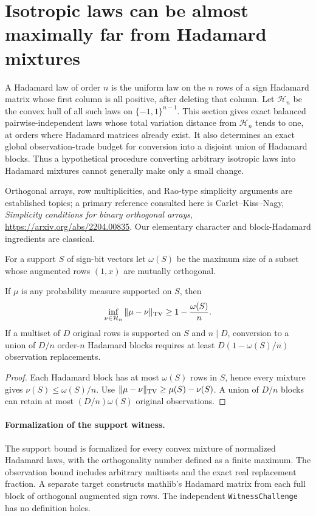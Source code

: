 
\section{Isotropic laws can be almost maximally far from Hadamard mixtures}
\label{s25:sec:design-hadamard-distance}
A Hadamard law of order $n$ is the uniform law on the $n$ rows of a
sign Hadamard matrix whose first column is all positive, after deleting
that column. Let $\mathcal H_n$ be the convex hull of all such laws on
$\{-1,1\}^{n-1}$. This section gives exact balanced pairwise-independent
laws whose total variation distance from $\mathcal H_n$ tends to one,
at orders where Hadamard matrices already exist. It also determines
an exact global observation-trade budget for conversion into a disjoint
union of Hadamard blocks. Thus a hypothetical procedure converting
arbitrary isotropic laws into Hadamard mixtures cannot generally make
only a small change.

Orthogonal arrays, row multiplicities, and Rao-type simplicity arguments
are established topics; a primary reference consulted here is
Carlet--Kiss--Nagy, \emph{Simplicity conditions for binary orthogonal arrays},
\url{https://arxiv.org/abs/2204.00835}. Our elementary character and
block-Hadamard ingredients are classical.

For a support $S$ of sign-bit vectors let $\omega(S)$ be the maximum
size of a subset whose augmented rows $(1,x)$ are mutually orthogonal.
\begin{lemma}
\label{s25:lem:design-support-witness}
If $\mu$ is any probability measure supported on $S$, then
\[
 \inf_{\nu\in\mathcal H_n}\|\mu-\nu\|_{\rm TV}
 \ge1-\frac{\omega(S)}n.
\]
If a multiset of $D$ original rows is supported on $S$ and $n\mid D$,
conversion to a union of $D/n$ order-$n$ Hadamard blocks requires at
least $D(1-\omega(S)/n)$ observation replacements.
\end{lemma}
\begin{proof}
Each Hadamard block has at most $\omega(S)$ rows in $S$, hence every
mixture gives $\nu(S)\le\omega(S)/n$. Use
$\|\mu-\nu\|_{\rm TV}\ge\mu(S)-\nu(S)$. A union of $D/n$ blocks
can retain at most $(D/n)\omega(S)$ original observations.
\end{proof}

\paragraph{Formalization of the support witness.}
The support bound is formalized for every convex mixture of normalized
Hadamard laws, with the orthogonality number defined as a finite maximum.
The observation bound includes arbitrary multisets and the exact real
replacement fraction. A separate target constructs mathlib's Hadamard
matrix from each full block of orthogonal augmented sign rows.
The independent \texttt{WitnessChallenge} has no definition holes.

